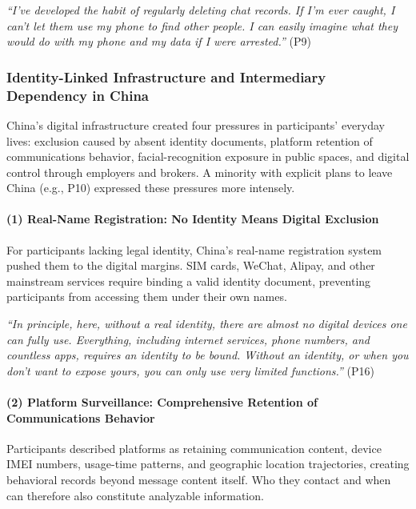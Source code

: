 \documentclass[conference,compsoc]{IEEEtran}
\begin{document}
\begin{displayquote}
\textit{``I've developed the habit of regularly deleting chat records. If I'm ever caught, I can't let them use my phone to find other people. I can easily imagine what they would do with my phone and my data if I were arrested.''} (P9)
\end{displayquote}

\subsubsection{Identity-Linked Infrastructure and Intermediary Dependency in China}
\label{subsubsec:identity-dependency}

China's digital infrastructure created four pressures in participants' everyday lives: exclusion caused by absent identity documents, platform retention of communications behavior, facial-recognition exposure in public spaces, and digital control through employers and brokers. A minority with explicit plans to leave China (e.g., P10) expressed these pressures more intensely.

\paragraph{\textbf{(1) Real-Name Registration: No Identity Means Digital Exclusion}}
For participants lacking legal identity, China's real-name registration system pushed them to the digital margins. SIM cards, WeChat, Alipay, and other mainstream services require binding a valid identity document, preventing participants from accessing them under their own names.

\begin{displayquote}
\textit{``In principle, here, without a real identity, there are almost no digital devices one can fully use. Everything, including internet services, phone numbers, and countless apps, requires an identity to be bound. Without an identity, or when you don't want to expose yours, you can only use very limited functions.''} (P16)
\end{displayquote}

\paragraph{\textbf{(2) Platform Surveillance: Comprehensive Retention of Communications Behavior}}
Participants described platforms as retaining communication content, device IMEI numbers, usage-time patterns, and geographic location trajectories, creating behavioral records beyond message content itself. Who they contact and when can therefore also constitute analyzable information.
\end{document}
